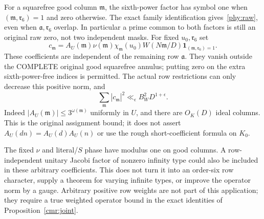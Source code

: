 For a squarefree good column $\mathfrak m$, the sixth-power factor has
symbol one when $(\mathfrak m,\mathfrak r_6)=1$ and zero otherwise.
The exact family identification gives~\eqref{phy:raw}, even when
$\mathfrak a,\mathfrak r_6$ overlap. In particular a prime common to
both factors is still an original raw zero, not two independent masks.
For fixed $u_0,\mathfrak r_6$ set
\[
 c_{\mathfrak m}=A_U(\mathfrak m)\nu(\mathfrak m)
       \chi_{\mathfrak m}(u_0)W(N\mathfrak m/D)
                       \mathbf1_{(\mathfrak m,\mathfrak r_6)=1}.
\]
These coefficients are independent of the remaining row $\mathfrak a$.
They vanish outside the COMPLETE original good squarefree annulus;
putting zero on the extra sixth-power-free indices is permitted.
The actual row restrictions can only decrease this positive norm, and
\begin{equation}\label{phy:coefficient-norm}
 \sum_{\mathfrak m}|c_{\mathfrak m}|^2
       \ll_\epsilon B_W^2D^{1+\epsilon}.
\end{equation}
Indeed $|A_U(\mathfrak m)|\le3^{\omega(\mathfrak m)}$
uniformly in $U$, and there are $O_K(D)$ ideal columns. This is the
original assignment bound; it does not assert
$A_U(dn)=A_U(d)A_U(n)$ or use the rough short-coefficient formula on $K_0$.

The fixed $\nu$ and literal/$S$ phase have modulus one on good columns.
A row-independent unitary Jacobi factor of nonzero infinity type could
also be included in these arbitrary coefficients. This does not turn it
into an order-six row character, supply a theorem for varying infinite
types, or improve the operator norm by a gauge. Arbitrary positive row
weights are not part of this application; they require a true weighted
operator bound in the exact identities of Proposition~\ref{cmr:joint}.

